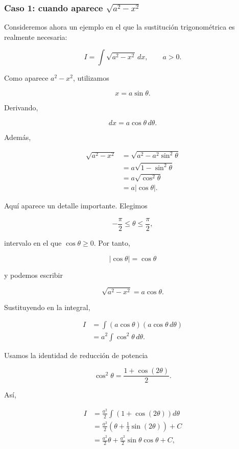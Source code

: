 \documentclass[12pt]{article}
\theoremstyle{definition}
\theoremstyle{remark}
\begin{document}
\subsubsection*{Caso 1: cuando aparece \(\sqrt{a^2-x^2}\)}

Consideremos ahora un ejemplo en el que la sustitución trigonométrica es
realmente necesaria:

\[
I=\int\sqrt{a^2-x^2}\,dx,\qquad a>0.
\]

Como aparece $a^2-x^2$, utilizamos

\[
\boxed{x=a\sin\theta}.
\]

Derivando,

\[
dx=a\cos\theta\,d\theta.
\]

Además,

\begin{align*}
\sqrt{a^2-x^2}
&=\sqrt{a^2-a^2\sin^2\theta}\\
&=a\sqrt{1-\sin^2\theta}\\
&=a\sqrt{\cos^2\theta}\\
&=a|\cos\theta|.
\end{align*}

Aquí aparece un detalle importante. Elegimos

\[
-\frac{\pi}{2}\leq\theta\leq\frac{\pi}{2},
\]

intervalo en el que $\cos\theta\geq0$. Por tanto,

\[
|\cos\theta|=\cos\theta
\]

y podemos escribir

\[
\sqrt{a^2-x^2}=a\cos\theta.
\]

Sustituyendo en la integral,

\begin{align*}
I
&=\int(a\cos\theta)(a\cos\theta\,d\theta)\\
&=a^2\int\cos^2\theta\,d\theta.
\end{align*}

Usamos la identidad de reducción de potencia

\[
\cos^2\theta=\frac{1+\cos(2\theta)}{2}.
\]

Así,

\begin{align*}
I
&=\frac{a^2}{2}\int\left(1+\cos(2\theta)\right)d\theta\\
&=\frac{a^2}{2}\left(\theta+\frac12\sin(2\theta)\right)+C\\
&=\frac{a^2}{2}\theta+
\frac{a^2}{2}\sin\theta\cos\theta+C,
\end{align*}
\end{document}
